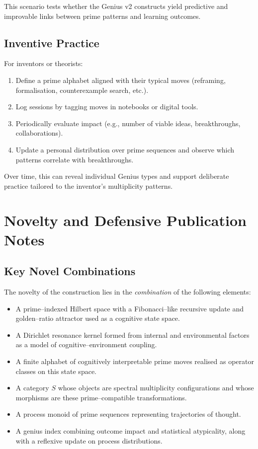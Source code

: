 \documentclass[11pt]{article}
\begin{document}
This scenario tests whether the Genius v2 constructs yield predictive and improvable links between prime patterns and learning outcomes.

\subsection{Inventive Practice}

For inventors or theorists:
\begin{enumerate}[nosep]
  \item Define a prime alphabet aligned with their typical moves (reframing, formalisation, counterexample search, etc.).
  \item Log sessions by tagging moves in notebooks or digital tools.
  \item Periodically evaluate impact (e.g., number of viable ideas, breakthroughs, collaborations).
  \item Update a personal distribution over prime sequences and observe which patterns correlate with breakthroughs.
\end{enumerate}

Over time, this can reveal individual Genius types and support deliberate practice tailored to the inventor's multiplicity patterns.

\section{Novelty and Defensive Publication Notes}

\subsection{Key Novel Combinations}

The novelty of the construction lies in the \emph{combination} of the following elements:
\begin{itemize}[nosep]
  \item A prime--indexed Hilbert space with a Fibonacci--like recursive update and golden--ratio attractor used as a cognitive state space.
  \item A Dirichlet resonance kernel formed from internal and environmental factors as a model of cognitive--environment coupling.
  \item A finite alphabet of cognitively interpretable prime moves realised as operator classes on this state space.
  \item A category $S$ whose objects are spectral multiplicity configurations and whose morphisms are these prime--compatible transformations.
  \item A process monoid of prime sequences representing trajectories of thought.
  \item A genius index combining outcome impact and statistical atypicality, along with a reflexive update on process distributions.
\end{itemize}
\end{document}
